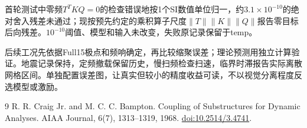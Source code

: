 \documentclass[UTF8,11pt,a4paper]{ctexart}
\begin{document}
首轮测试中零频$T^TKQ=0$的检查错误地按1个SI数值单位归一，约$3.1\times10^{-10}$的绝对舍入残差未通过；现按预先约定的乘积算子尺度$\|T\|\|K\|\|Q\|$报告零目标后向残差。$10^{-10}$阈值、模型和输入未改变，失败原记录保留于temp。

后续工况先依据Full15极点和频响确定，再比较缩聚误差；理论预测用独立计算验证。地震记录保持，定频撤载保留历史，慢扫频检查扫速，临界时滞报告实际离散网格区间。单独配置误差图，让真实但较小的精度收益可读，不以视觉分离程度反选模型或激励。

\begin{thebibliography}{9}
 R. R. Craig Jr. and M. C. C. Bampton.
Coupling of Substructures for Dynamic Analyses. AIAA Journal, 6(7), 1313--1319, 1968.
\href{https://doi.org/10.2514/3.4741}{doi:10.2514/3.4741}.
\end{thebibliography}
\end{document}
